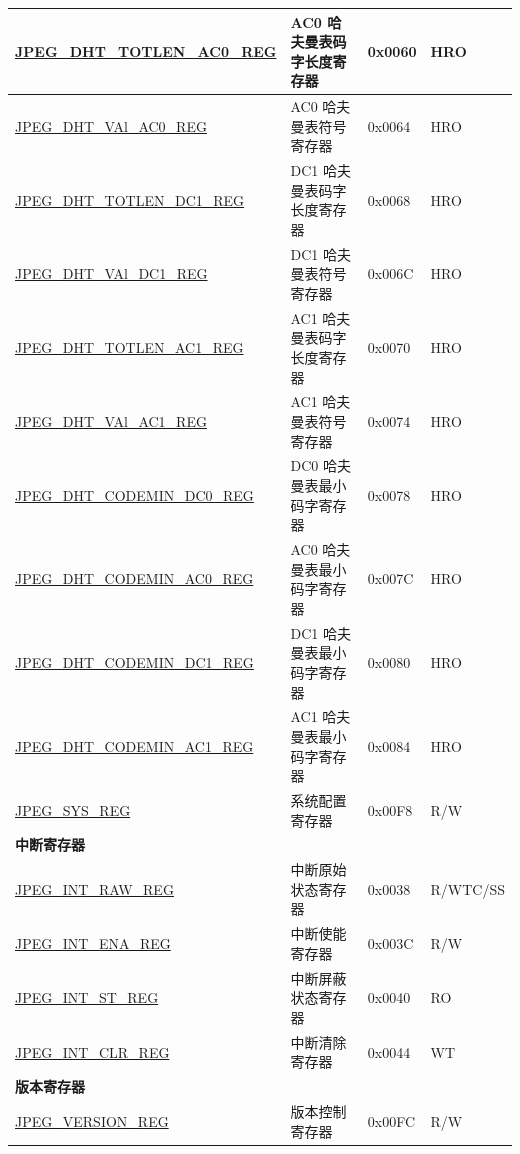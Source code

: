 \begin{longtable}{ | l | l | p{1.3cm} | l | }
\hyperref[regdesc:JPEGDHTTOTLENAC0REG]{JPEG\_DHT\_TOTLEN\_AC0\_REG} & AC0 哈夫曼表码字长度寄存器 & 0x0060 & HRO \\ \hline
\hyperref[regdesc:JPEGDHTVALAC0REG]{JPEG\_DHT\_VAl\_AC0\_REG} & AC0 哈夫曼表符号寄存器 & 0x0064 & HRO \\ \hline
\hyperref[regdesc:JPEGDHTTOTLENDC1REG]{JPEG\_DHT\_TOTLEN\_DC1\_REG} & DC1 哈夫曼表码字长度寄存器 & 0x0068 & HRO \\ \hline
\hyperref[regdesc:JPEGDHTVALDC1REG]{JPEG\_DHT\_VAl\_DC1\_REG} & DC1 哈夫曼表符号寄存器 & 0x006C & HRO \\ \hline
\hyperref[regdesc:JPEGDHTTOTLENAC1REG]{JPEG\_DHT\_TOTLEN\_AC1\_REG} & AC1 哈夫曼表码字长度寄存器 & 0x0070 & HRO \\ \hline
\hyperref[regdesc:JPEGDHTVALAC1REG]{JPEG\_DHT\_VAl\_AC1\_REG} & AC1 哈夫曼表符号寄存器 & 0x0074 & HRO \\ \hline
\hyperref[regdesc:JPEGDHTCODEMINDC0REG]{JPEG\_DHT\_CODEMIN\_DC0\_REG} & DC0 哈夫曼表最小码字寄存器 & 0x0078 & HRO \\ \hline
\hyperref[regdesc:JPEGDHTCODEMINAC0REG]{JPEG\_DHT\_CODEMIN\_AC0\_REG} & AC0 哈夫曼表最小码字寄存器 & 0x007C & HRO \\ \hline
\hyperref[regdesc:JPEGDHTCODEMINDC1REG]{JPEG\_DHT\_CODEMIN\_DC1\_REG} & DC1 哈夫曼表最小码字寄存器 & 0x0080 & HRO \\ \hline
\hyperref[regdesc:JPEGDHTCODEMINAC1REG]{JPEG\_DHT\_CODEMIN\_AC1\_REG} & AC1 哈夫曼表最小码字寄存器 & 0x0084 & HRO \\ \hline
\hyperref[regdesc:JPEGSYSREG]{JPEG\_SYS\_REG} & 系统配置寄存器 & 0x00F8 & R/W \\ \hline
\multicolumn{4}{|l|}{\textbf{中断寄存器}} \\ \hline
\hyperref[regdesc:JPEGINTRAWREG]{JPEG\_INT\_RAW\_REG} & 中断原始状态寄存器 & 0x0038 & R/WTC/SS \\ \hline
\hyperref[regdesc:JPEGINTENAREG]{JPEG\_INT\_ENA\_REG} & 中断使能寄存器 & 0x003C & R/W \\ \hline
\hyperref[regdesc:JPEGINTSTREG]{JPEG\_INT\_ST\_REG} & 中断屏蔽状态寄存器 & 0x0040 & RO \\ \hline
\hyperref[regdesc:JPEGINTCLRREG]{JPEG\_INT\_CLR\_REG} & 中断清除寄存器 & 0x0044 & WT \\ \hline
\multicolumn{4}{|l|}{\textbf{版本寄存器}} \\ \hline
\hyperref[regdesc:JPEGVERSIONREG]{JPEG\_VERSION\_REG} & 版本控制寄存器 & 0x00FC & R/W \\ \hline
\end{longtable}
